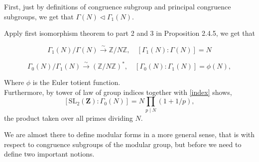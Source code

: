 \begin{remark} First, just by definitions of congruence subgroup and principal congruence subgroups, we get that $\Gamma(N) \triangleleft \Gamma_{1}(N)$.

Apply first isomorphism theorem to part 2 and 3 in Proposition 2.4.5, we get that 

$$
\Gamma_{1}(N) / \Gamma(N) \stackrel{\sim}{\longrightarrow} \mathbb{Z} / N \mathbb{Z}, \quad\left[\Gamma_{1}(N): \Gamma(N)\right]=N
$$

$$
\Gamma_{0}(N) / \Gamma_{1}(N) \stackrel{\sim}{\longrightarrow}(\mathbb{Z} / N \mathbb{Z})^{*}, \quad\left[\Gamma_{0}(N): \Gamma_{1}(N)\right]=\phi(N),
$$

Where $\phi$ is the Euler totient function. \\

Furthermore, by tower of law of group indices together with \ref{index} shows, $$\left[\mathrm{SL}_{2}(\mathbf{Z}): \Gamma_{0}(N)\right]=N \prod_{p \mid N}(1+1 / p),$$ the product taken over all primes dividing $N$.
    
\end{remark}

We are almost there to define modular forms in a more general sense, that is with respect to congruence subgroups of the modular group, but before we need to define two important notions.


